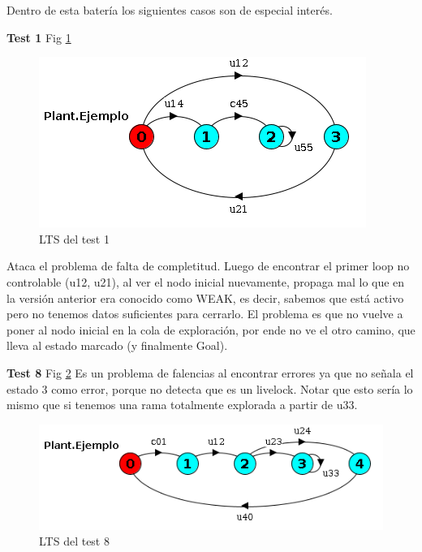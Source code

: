 Dentro de esta batería los siguientes casos son de especial interés.
\bigskip

\textbf{Test 1} Fig \ref{fig:test1}
\begin{figure}
 \centering
 \includegraphics[scale=0.7]{figures/tests/test1.png}
 \caption{LTS del test 1}
 \label{fig:test1}
\end{figure}
Ataca el problema de falta de completitud. Luego de encontrar el primer loop no controlable (u12, u21), al ver el nodo inicial nuevamente, propaga mal lo que en la versión anterior era conocido como WEAK, es decir, sabemos que está activo pero no tenemos datos suficientes para cerrarlo. El problema es que no vuelve a poner al nodo inicial en la cola de exploración, por ende no ve el otro camino, que lleva al estado marcado (y finalmente Goal).


\smallskip
\textbf{Test 8} Fig \ref{fig:test8} Es un problema de falencias al encontrar errores ya que no señala el estado 3 como error, porque no detecta que es un livelock. Notar que esto sería lo mismo que si tenemos una rama totalmente explorada a partir de u33.
\begin{figure}
 \centering
 \includegraphics[scale=0.7]{figures/tests/test8.png}
 \caption{LTS del test 8}
 \label{fig:test8}
\end{figure}

